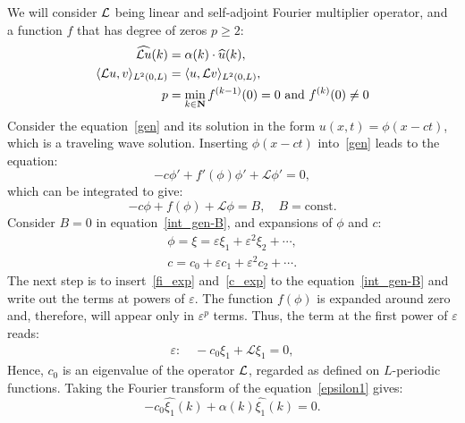 	We will consider $\mathcal{L}$ being linear and self-adjoint Fourier multiplier operator, and a function $f$ that has degree of zeros $p \geq 2$:
\begin{align*}
\widehat{\mathcal{L} u}(k) &= \alpha(k) \cdot \widehat{u}(k),\\
\langle\mathcal{L} u, v \rangle_{L^2(0,L)} &= \langle u, \mathcal{L} v\rangle_{L^2(0,L)}, \\
p &= \min_{k \in \mathbf{N}}{f^{(k-1)}(0) =0 \text{ and } f^{(k)}(0)\neq 0}
\end{align*}
	 Consider the equation~\eqref{gen} and its solution in the form $u(x,t) = \phi(x-ct)$, which is a traveling wave solution. Inserting $\phi(x-ct)$ into~\eqref{gen} leads to the equation:
\begin{equation*}
-c\phi' + f'(\phi)\phi'+\mathcal{L}\phi'= 0,
\end{equation*}
	 which can be integrated to give:
\begin{equation}
-c\phi + f(\phi)+\mathcal{L}\phi= B, \quad B = \mathrm{const}. \label{int_gen-B}
\end{equation}
	Consider $B = 0$ in equation~\eqref{int_gen-B}, and expansions of $\phi$ and $c$:
\begin{align}
\phi = \xi = \varepsilon\xi_1 + \varepsilon^2\xi_2+ \cdots, \label{fi_exp}\\
c = c_0 + \varepsilon c_1 + \varepsilon^2 c_2+\cdots. \label{c_exp}
\end{align}
	 The next step is to insert~\eqref{fi_exp} and~\eqref{c_exp} to the equation~\eqref{int_gen-B} and write out the terms at powers of $\varepsilon$. 
	The function $f(\phi)$ is expanded around zero and, therefore, will appear only in $\varepsilon^p$ terms. 
	Thus, the term at the first power of $\varepsilon$ reads: 
\begin{align}
\varepsilon: \quad -c_0\xi_1 + \mathcal{L}\xi_1 = 0, \label{epsilon1}
\end{align}
	 Hence, $c_0$ is an eigenvalue of the operator $\mathcal{L}$, regarded as defined on $L$-periodic functions. 
	 Taking the Fourier transform of the equation~\eqref{epsilon1} gives:
\begin{equation}
-c_0\widehat{\xi_1}(k) + \alpha(k)\widehat{\xi_1}(k) = 0 . \label{eps1-transformed}
\end{equation}
